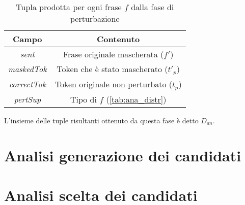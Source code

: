 \begin{table}[H]
\centering
\begin{tabular}{cc}
\textbf{Campo} & \textbf{Contenuto}\\ \hline
\textit{sent} & Frase originale mascherata ($f\prime$)\\
\textit{maskedTok} & Token che è stato mascherato ($t\prime_p$)\\
\textit{correctTok} & Token originale non perturbato ($t_p$)\\
\textit{pertSup} & Tipo di $f$ (\autoref{tab:ana_distr}) \\


\end{tabular}
\caption{Tupla prodotta per ogni frase $f$ dalla fase di perturbazione}
\label{tab:ana_tuplapert}
\end{table}
\noindent
L'insieme delle tuple risultanti ottenuto da questa fase è detto $D_{an}$.








\section{Analisi generazione dei candidati}
\label{sec:ana_bert}

\section{Analisi scelta dei candidati}
\label{sec:ana_cor}